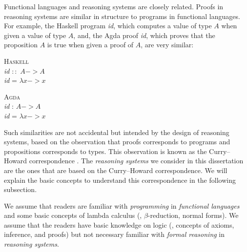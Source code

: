 Functional languages and reasoning systems are closely related.
Proofs in reasoning systems are similar in structure to programs
in functional languages. For example, the Haskell program \textit{id},
which computes a value of type $A$ when given a value of type $A$,
and, the Agda proof \textit{id}, which proves that the proposition $A$
is true when given a proof of $A$, are very similar:
\begin{center}
\begin{singlespace}
\begin{minipage}{.4\linewidth}
	\textsc{Haskell} \vspace*{.5em} \\
\textit{id} $::$ $A -> A$ \\
\textit{id} = $\lambda x -> x$
\end{minipage}
\begin{minipage}{.4\linewidth}
	\textsc{Agda}  \vspace*{.5em} \\
\textit{id} : $A -> A$ \\
\textit{id} = $\lambda x -> x$
\end{minipage}
\end{singlespace}
\end{center}\vspace*{.5em}
Such similarities are not accidental but intended by the design of
reasoning systems, based on the observation that proofs corresponds
to programs and propositions corresponds to types. This observation
is known as the Curry--Howard correspondence \cite{Howard69}.
The \emph{reasoning systems} we consider in this dissertation
are the ones that are based on the Curry--Howard correspondence.
We will explain the basic concepts to understand this correspondence
in the following subsection.

We assume that readers are familiar with \emph{programming}
in \emph{functional languages} and some basic concepts of lambda calculus
(\eg, $\beta$-reduction, normal forms). We assume that the readers have
basic knowledge on logic (\eg, concepts of axioms, inference, and proofs)
but not necessary familiar with \emph{formal reasoning}
in \emph{reasoning systems}.

